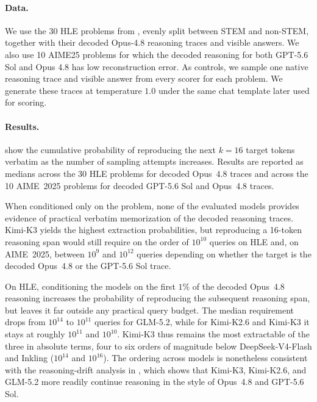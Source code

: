 \paragraph{Data.} We use the 30 HLE problems from , evenly split between STEM and non-STEM, together with their decoded Opus-4.8 reasoning traces and visible answers. We also use 10 AIME25 problems for which the decoded reasoning for both GPT-5.6 Sol and Opus 4.8 has low reconstruction error. As controls, we sample one native reasoning trace and visible answer from every scorer for each problem. We generate these traces at temperature \(1.0\) under the same chat template later used for scoring.

\paragraph{Results.}

 show the cumulative probability of reproducing the next \(k=16\) target tokens verbatim as the number of sampling attempts increases. Results are reported as medians across the 30 HLE problems for decoded Opus~4.8 traces and across the 10 AIME~2025 problems for decoded GPT-5.6 Sol and Opus~4.8 traces.

When conditioned only on the problem, none of the evaluated models provides evidence of practical verbatim memorization of the decoded reasoning traces. Kimi-K3 yields the highest extraction probabilities, but reproducing a 16-token reasoning span would still require on the order of \(10^{10}\) queries on HLE and, on AIME~2025, between \(10^{9}\) and \(10^{12}\) queries depending on whether the target is the decoded Opus~4.8 or the GPT-5.6 Sol trace.

On HLE, conditioning the models on the first \(1\%\) of the decoded Opus~4.8 reasoning increases the probability of reproducing the subsequent reasoning span, but leaves it far outside any practical query budget. The median requirement drops from \(10^{14}\) to \(10^{11}\) queries for GLM-5.2, while for Kimi-K2.6 and Kimi-K3 it stays at roughly \(10^{11}\) and \(10^{10}\). Kimi-K3 thus remains the most extractable of the three in absolute terms, four to six orders of magnitude below DeepSeek-V4-Flash and Inkling (\(10^{14}\) and \(10^{16}\)). The ordering across models is nonetheless consistent with the reasoning-drift analysis in , which shows that Kimi-K3, Kimi-K2.6, and GLM-5.2 more readily continue reasoning in the style of Opus~4.8 and GPT-5.6 Sol.

